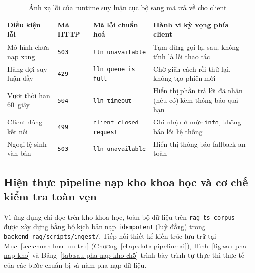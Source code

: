 \begin{table}[htbp]
\centering
\caption{Ánh xạ lỗi của runtime suy luận cục bộ sang mã trả về cho client}
\label{tab:anh-xa-loi-llm-ch5}
\small
\begin{tabularx}{\textwidth}{
  >{\raggedright\arraybackslash}p{3.4cm}
  >{\raggedright\arraybackslash}p{1.6cm}
  >{\raggedright\arraybackslash}p{3.8cm}
  >{\raggedright\arraybackslash}X
}
\toprule
\textbf{Điều kiện lỗi} & \textbf{Mã HTTP} & \textbf{Mã lỗi chuẩn hoá} & \textbf{Hành vi kỳ vọng phía client} \\
\midrule
Mô hình chưa nạp xong & \texttt{503} & \texttt{llm unavailable} & Tạm dừng gọi lại sau, không tính là lỗi thao tác \\
\midrule
Hàng đợi suy luận đầy & \texttt{429} & \texttt{llm queue is full} & Chờ giãn cách rồi thử lại, không tạo phiên mới \\
\midrule
Vượt thời hạn 60~giây & \texttt{504} & \texttt{llm timeout} & Hiển thị phần trả lời đã nhận (nếu có) kèm thông báo quá hạn \\
\midrule
Client đóng kết nối & \texttt{499} & \texttt{client closed request} & Ghi nhận ở mức \texttt{info}, không báo lỗi hệ thống \\
\midrule
Ngoại lệ sinh văn bản & \texttt{503} & \texttt{llm unavailable} & Hiển thị thông báo fallback an toàn \\
\bottomrule
\end{tabularx}
\end{table}

\subsection{Hiện thực pipeline nạp kho khoa học và cơ chế kiểm tra toàn vẹn}
\label{subsec:duong-ong-nap-kho}

Vì ứng dụng chỉ đọc trên kho khoa học, toàn bộ dữ liệu trên \texttt{rag\_\allowbreak{}ts\_\allowbreak{}corpus} được xây dựng bằng bộ kịch bản nạp \texttt{idempotent} (luỹ đẳng) trong \texttt{backend\_\allowbreak{}rag/\allowbreak{}scripts/\allowbreak{}ingest/}. Tiếp nối thiết kế kiến trúc lưu trữ tại Mục~\ref{sec:chuan-hoa-luu-tru} (Chương~\ref{chap:data-pipeline-ai}), Hình~\ref{fig:sau-pha-nap-kho} và Bảng~\ref{tab:sau-pha-nap-kho-ch5} trình bày trình tự thực thi thực tế của các bước chuẩn bị và năm pha nạp dữ liệu.

